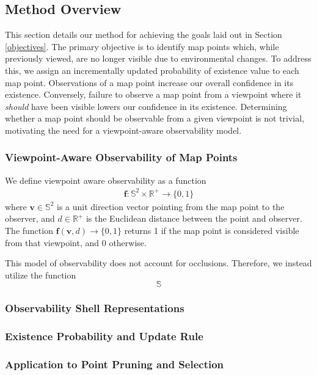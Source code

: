 \subsection{Method Overview}

This section details our method for achieving the goals laid out in Section \ref{objectives}. The primary objective is to identify map points which, while previously viewed, are no longer visible due to environmental changes. To address this, we assign an incrementally updated probability of existence value to each map point. Observations of a map point increase our overall confidence in its existence. Conversely, failure to observe a map point from a viewpoint where it \textit{should} have been visible lowers our confidence in its existence. Determining whether a map point should be observable from a given viewpoint is not trivial, motivating the need for a viewpoint-aware observability model.

\subsubsection{Viewpoint-Aware Observability of Map Points}


We define viewpoint aware observability as a function
\begin{align*}
    \boldsymbol{f:}\mathbb{S}^2\times\mathbb{R}^+\rightarrow\{0,1\}
\end{align*}
where $\mathbf{v}\in\mathbb{S}^2$ is a unit direction vector pointing from the map point to the observer, and $d\in\mathbb{R}^+$ is the Euclidean distance between the point and observer. The function $\boldsymbol{f}(\mathbf{v}, d)\rightarrow\{0,1\}$ returns 1 if the map point is considered visible from that viewpoint, and 0 otherwise.


This model of observability does not account for occlusions. Therefore, we instead utilize the function
$$
    \mathbb{S}
$$



\subsubsection{Observability Shell Representations}

\subsubsection{Existence Probability and Update Rule}

\subsubsection{Application to Point Pruning and Selection}

